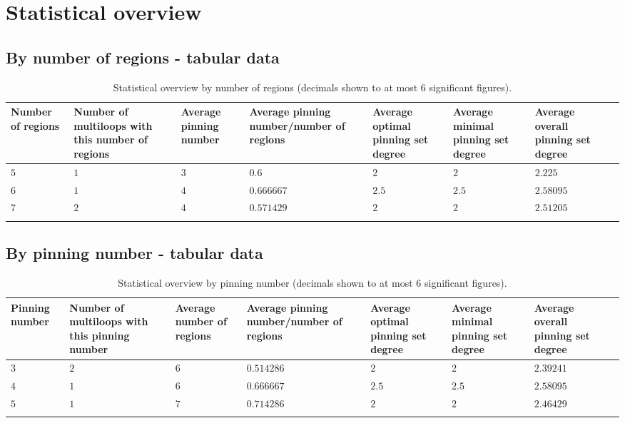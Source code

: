 \documentclass{article}%
\begin{document}



\small

\newpage

\section{Statistical overview}
\label{sec:stats}

\subsection{By number of regions - tabular data}
\label{sec:byRegions}

\begin{table}[ht]
	\caption{Statistical overview by number of regions (decimals shown to at most $6$ significant figures).}
	\centering
	\renewcommand{\arraystretch}{1.5}
	\begin{tabularx}{\textwidth}{lXXXXXXX}
		\toprule
			Number of regions & Number of multiloops with this number of regions & Average pinning number & Average pinning number/number of regions & Average optimal pinning set degree & Average minimal pinning set degree & Average overall pinning set degree\\
			\hline
			$5$ & $1$ & $3$ & $0.6$ & $2$ & $2$ & $2.225$ \\
			$6$ & $1$ & $4$ & $0.666667$ & $2.5$ & $2.5$ & $2.58095$ \\
			$7$ & $2$ & $4$ & $0.571429$ & $2$ & $2$ & $2.51205$ \\
		\bottomrule \\ 
	\end{tabularx}
\end{table}

\newpage

\subsection{By pinning number - tabular data}
\label{sec:byPinning}

\begin{table}[ht]
	\caption{Statistical overview by pinning number (decimals shown to at most $6$ significant figures).}
	\centering
	\renewcommand{\arraystretch}{1.5}
	\begin{tabularx}{\textwidth}{lXXXXXXX}
		\toprule
			Pinning number & Number of multiloops with this pinning number & Average number of regions & Average pinning number/number of regions & Average optimal pinning set degree & Average minimal pinning set degree & Average overall pinning set degree\\
			\hline
			$3$ & $2$ & $6$ & $0.514286$ & $2$ & $2$ & $2.39241$ \\
			$4$ & $1$ & $6$ & $0.666667$ & $2.5$ & $2.5$ & $2.58095$ \\
			$5$ & $1$ & $7$ & $0.714286$ & $2$ & $2$ & $2.46429$ \\
		\bottomrule \\ 
	\end{tabularx}
\end{table}
\end{document}
